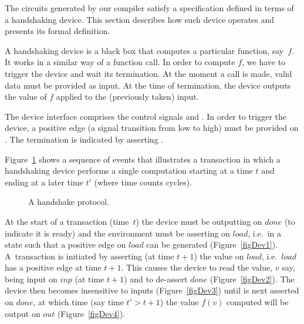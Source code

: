 
The circuits generated by our compiler satisfy
a specification defined in terms of a handshaking device.
This section describes how such device operates and 
presents its formal definition.

A handshaking device is a black box that 
computes a particular function, say~$f$. 
It works in a similar way of a function call.
In order to compute $f$, we have to trigger 
the device and wait its termination.
At the moment a call is made, valid data
must be provided as input. At the time of
termination, the device outputs the value
of $f$ applied to the (previously taken) input.

The device interface comprises
the control signals  and .
In order to trigger the device, a positive
edge (a signal transition from low to high)
must be provided on . The termination
is indicated by asserting .

Figure~\ref{figDev} shows a sequence of events that illustrates a
transaction in which a handshaking device performs a single
computation starting at a time $t$ and ending at a later time $t'$
(where time counts cycles). 

\begin{figure}[htb]
   \centerline{
      }
   \hspace*{0.4cm}
   \centerline{
      \hspace*{0cm}}
      \caption{\label{figDev}A handshake protocol.}
\end{figure}
At the start of a transaction (time~$t$) the device must be outputting  on $done$
(to indicate it is ready) and the environment must be asserting
 on $load$, i.e.~in a state such that a positive edge on $load$
can be generated (Figure~\ref{figDev1}). 
A~transaction is initiated by asserting (at time
$t{+}1$) the value  on $load$, i.e.~$load$ has a positive edge
at time $t{+}1$. This causes the device to read the value, $v$
say, being input on $inp$ (at time $t{+}1$) and to de-assert $done$
(Figure~\ref{figDev2}).
The device then becomes insensitive to inputs (Figure~\ref{figDev3})
until  is next asserted on $done$,
at which time (say time $t' > t{+}1$) the value
$f(v)$ computed will be output on $out$ (Figure~\ref{figDev4}).

